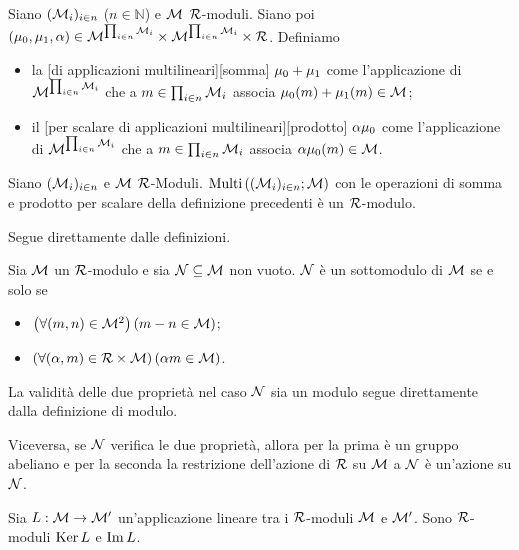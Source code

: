 \begin{Definition}
	Siano $(\mathcal{M}_i)_{i \in n}$ ($n \in \mathbb{N}$) e $\mathcal{M}$ $\mathcal{R}$-moduli. Siano poi $(\mu_0,\mu_1,\alpha) \in \mathcal{M}^{\prod_{i \in n} \mathcal{M}_i} \times \mathcal{M}^{\prod_{i \in n} \mathcal{M}_i} \times \mathcal{R}$. Definiamo
	\begin{itemize}
		\item la [di applicazioni multilineari][somma] $\mu_0 + \mu_1$ come l'applicazione di $\mathcal{M}^{\prod_{i \in n} \mathcal{M}_i}$ che a $m \in \prod_{i \in n} \mathcal{M}_i$ associa $\mu_0(m) + \mu_1(m) \in \mathcal{M}$;
		\item il [per scalare di applicazioni multilineari][prodotto] $\alpha \mu_0$ come l'applicazione di $\mathcal{M}^{\prod_{i \in n} \mathcal{M}_i}$ che a $m \in \prod_{i \in n} \mathcal{M}_i$ associa $\alpha \mu_0(m) \in \mathcal{M}$.
	\end{itemize}
\end{Definition}
\begin{Theorem}
	Siano $(\mathcal{M}_i)_{i \in n}$ e $\mathcal{M}$ $\mathcal{R}$-Moduli. $\text{Multi}\left ( (\mathcal{M}_i)_{i \in n} ; \mathcal{M} \right )$ con le operazioni di somma e prodotto per scalare della definizione precedenti \`e un $\mathcal{R}$-modulo.
\end{Theorem}
\Proof Segue direttamente dalle definizioni. \EndProof
\begin{Theorem}
	Sia $\mathcal{M}$ un $\mathcal{R}$-modulo e sia $\mathcal{N} \subseteq \mathcal{M}$ non vuoto. $\mathcal{N}$ \`e un sottomodulo di $\mathcal{M}$ se e solo se
	\begin{itemize}
		\item $\left ( \forall (m,n) \in \mathcal{M}^2 \right ) \left ( m - n \in \mathcal{M} \right )$;
		\item $\left ( \forall (\alpha,m) \in \mathcal{R} \times \mathcal{M} \right ) \left ( \alpha m \in \mathcal{M} \right )$.
	\end{itemize}
\end{Theorem}
\Proof La validit\`a delle due propriet\`a nel caso $\mathcal{N}$ sia un modulo segue direttamente dalla definizione di modulo.
\par Viceversa, se $\mathcal{N}$ verifica le due propriet\`a, allora per la prima \`e un gruppo abeliano e per la seconda la restrizione dell'azione di $\mathcal{R}$ su $\mathcal{M}$ a $\mathcal{N}$ \`e un'azione su $\mathcal{N}$. \EndProof
\begin{Theorem}
	Sia $L: \mathcal{M} \rightarrow \mathcal{M}'$ un'applicazione
	lineare tra i $\mathcal{R}$-moduli $\mathcal{M}$ e $\mathcal{M}'$. Sono
	$\mathcal{R}$-moduli $\operatorname{Ker}{L}$ e $\operatorname{Im}{L}$.
\end{Theorem}
